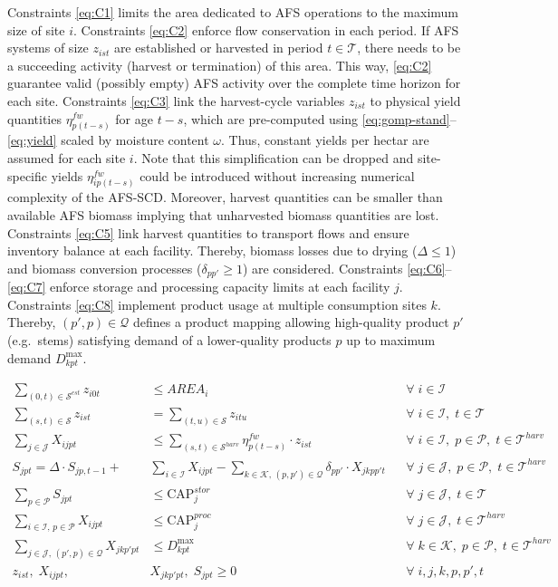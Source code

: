 \documentclass[APA,TimesLARGE]{WileyNJDv5} %
\newcommand{\Tc}{\mathcal{T}}
\newcommand{\Pc}{\mathcal{P}}
\newcommand{\Qc}{\mathcal{Q}}
\newcommand{\Sc}{\mathcal{S}}
\newcommand{\Ic}{\mathcal{I}}
\newcommand{\Jc}{\mathcal{J}}
\newcommand{\Kc}{\mathcal{K}}
\renewcommand{\problem}{AFS-SCD}
\begin{document}
Constraints \eqref{eq:C1} limits the area dedicated to AFS operations to the maximum size of site \(i\). Constraints \eqref{eq:C2} enforce flow conservation in each period. If AFS systems of size \(z_{ist}\) are established or harvested in period \(t \in \Tc\), there needs to be a succeeding activity (harvest or termination) of this area. This way, \eqref{eq:C2} guarantee valid (possibly empty) AFS activity over the complete time horizon for each site. Constraints \eqref{eq:C3} link the harvest-cycle variables \(z_{ist}\) to physical yield quantities \(\eta^{fw}_{p(t-s)}\) for age \(t-s\), which are pre-computed using \eqref{eq:gomp-stand}--\eqref{eq:yield} scaled by moisture content \(\omega\). Thus, constant yields per hectar are assumed for each site \(i\). Note that this simplification can be dropped and site-specific yields \(\eta^{fw}_{ip(t-s)}\) could be introduced without increasing numerical complexity of the \problem. Moreover, harvest quantities can be smaller than available AFS biomass implying that unharvested biomass quantities are lost. Constraints \eqref{eq:C5} link harvest quantities to transport flows and ensure inventory balance at each facility. Thereby, biomass losses due to drying (\(\Delta \leq 1\)) and biomass conversion processes (\(\delta_{pp'} \geq 1\)) are considered. Constraints \eqref{eq:C6}--\eqref{eq:C7} enforce storage and processing capacity limits at each facility \(j\). Constraints \eqref{eq:C8} implement product usage at multiple consumption sites \(k\). Thereby, \((p',p) \in \Qc\) defines a product mapping allowing high-quality product \(p'\) (e.g.~stems) satisfying demand of a lower-quality products \(p\) up to maximum demand \(D^{\max}_{kpt}\).

\begin{align}
  \sum_{(0,t) \in \Sc^{{est}}} z_{i0t} &\leq AREA_i && \forall\; i \in \Ic \label{eq:C1} \\[1pt]
  \sum_{(s,t) \in \Sc} z_{ist} &= \sum_{(t,u) \in \Sc} z_{itu} && \forall\; i \in \Ic,\; t \in \Tc \label{eq:C2} \\[1pt]
  \sum_{j \in \Jc} X_{ijpt}    &\leq \sum_{(s,t) \in \Sc^{{harv}}} \eta^{fw}_{p(t-s)} \cdot z_{ist} && \forall\; i \in \Ic,\; p \in \Pc,\; t \in \Tc^{{harv}}     \label{eq:C3} \\[1pt]
  S_{jpt}    = \Delta \cdot S_{jp,t-1} + &\sum_{i \in \Ic} X_{ijpt} - \sum_{k \in \Kc,\,(p,p') \in \Qc} \delta_{pp'} \cdot  X_{jkpp't}   && \forall\; j \in \Jc,\; p \in \Pc,\; t \in \Tc^{harv}  \label{eq:C5} \\[1pt]
  \sum_{p \in \Pc} S_{jpt}    &\leq \text{CAP}^{{stor}}_j    && \forall\; j \in \Jc,\; t \in \Tc     \label{eq:C6} \\[1pt]
  \sum_{i \in \Ic,\, p \in \Pc} X_{ijpt}  &\leq \text{CAP}^{{proc}}_j && \forall\; j \in \Jc,\; t \in \Tc^{harv} \label{eq:C7} \\[1pt]
  \sum_{j \in \Jc,\,(p',p) \in \Qc} X_{jkp'pt} &\leq D^{\max}_{kpt} && \forall\; k \in \Kc,\; p \in \Pc,\; t \in \Tc^{harv}     \label{eq:C8} \\[1pt]
  z_{ist},\;X_{ijpt},\; &X_{jkp'pt},\; S_{jpt} \geq 0 && \forall\; i,j,k,p,p',t     \label{eq:D2}
\end{align}
\end{document}
